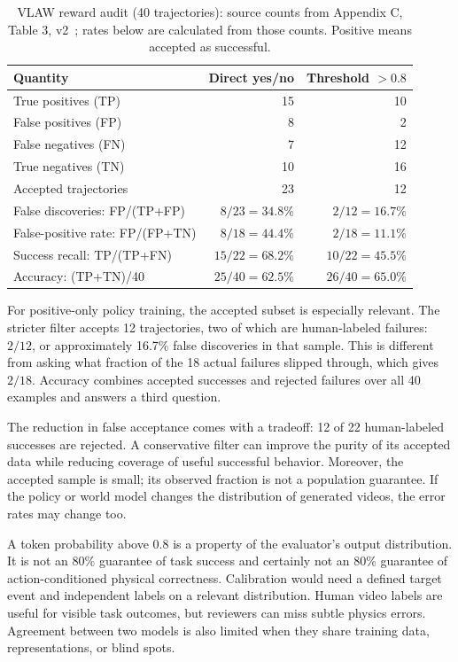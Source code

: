 \begin{table}[htbp]\centering\small
\caption{VLAW reward audit (40 trajectories): source counts from Appendix C, Table 3, v2~\citep{vlaw}; rates below are calculated from those counts. Positive means accepted as successful.}
\begin{tabular}{@{}lrr@{}}\toprule
Quantity & Direct yes/no & Threshold $>0.8$\\\midrule
True positives (TP) & 15 & 10\\
False positives (FP) & 8 & 2\\
False negatives (FN) & 7 & 12\\
True negatives (TN) & 10 & 16\\\midrule
Accepted trajectories & 23 & 12\\
False discoveries: FP/(TP+FP) & $8/23=34.8\%$ & $2/12=16.7\%$\\
False-positive rate: FP/(FP+TN) & $8/18=44.4\%$ & $2/18=11.1\%$\\
Success recall: TP/(TP+FN) & $15/22=68.2\%$ & $10/22=45.5\%$\\
Accuracy: (TP+TN)/40 & $25/40=62.5\%$ & $26/40=65.0\%$\\\bottomrule
\end{tabular}\label{tab:audit}
\end{table}

For positive-only policy training, the accepted subset is especially relevant. The stricter filter accepts 12 trajectories, two of which are human-labeled failures: $2/12$, or approximately 16.7\% false discoveries in that sample. This is different from asking what fraction of the 18 actual failures slipped through, which gives $2/18$. Accuracy combines accepted successes and rejected failures over all 40 examples and answers a third question.

The reduction in false acceptance comes with a tradeoff: 12 of 22 human-labeled successes are rejected. A conservative filter can improve the purity of its accepted data while reducing coverage of useful successful behavior. Moreover, the accepted sample is small; its observed fraction is not a population guarantee. If the policy or world model changes the distribution of generated videos, the error rates may change too.

A token probability above $0.8$ is a property of the evaluator's output distribution. It is not an 80\% guarantee of task success and certainly not an 80\% guarantee of action-conditioned physical correctness. Calibration would need a defined target event and independent labels on a relevant distribution. Human video labels are useful for visible task outcomes, but reviewers can miss subtle physics errors. Agreement between two models is also limited when they share training data, representations, or blind spots.

